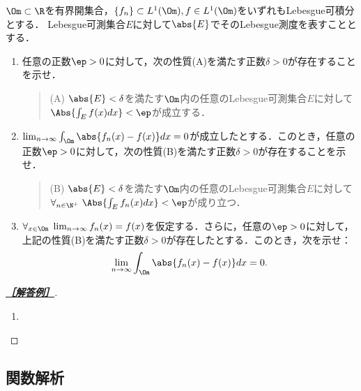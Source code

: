 \documentclass[uplatex,dvipdfmx]{jsarticle}
\begin{document}
\begin{tcolorbox}[colframe=ForestGreen, colback=ForestGreen!10!white,breakable,colbacktitle=ForestGreen!40!white,coltitle=black,fonttitle=\bfseries\sffamily,
    title=B 第9問（実解析）]
    $\Om\subset\R$を有界開集合，$\{f_n\}\subset L^1(\Om),f\in L^1(\Om)$をいずれもLebesgue可積分とする．
    Lebesgue可測集合$E$に対して$\abs{E}$でそのLebesgue測度を表すこととする．
    \begin{enumerate}
        \item 任意の正数$\ep>0$に対して，次の性質(A)を満たす正数$\delta>0$が存在することを示せ．
        \begin{quote}
            (A) $\abs{E}<\delta$を満たす$\Om$内の任意のLebesgue可測集合$E$に対して$\Abs{\int_Ef(x)dx}<\ep$が成立する．
        \end{quote}
        \item $\lim_{n\to\infty}\int_\Om\abs{f_n(x)-f(x)}dx=0$が成立したとする．このとき，任意の正数$\ep>0$に対して，次の性質(B)を満たす正数$\delta>0$が存在することを示せ．
        \begin{quote}
            (B) $\abs{E}<\delta$を満たす$\Om$内の任意のLebesgue可測集合$E$に対して$\forall_{n\in\N^+}\;\Abs{\int_Ef_n(x)dx}<\ep$が成り立つ．
        \end{quote}
        \item $\forall_{x\in\Om}\;\lim_{n\to\infty}f_n(x)=f(x)$を仮定する．さらに，任意の$\ep>0$に対して，上記の性質(B)を満たす正数$\delta>0$が存在したとする．このとき，次を示せ：
        \[\lim_{n\to\infty}\int_\Om\abs{f_n(x)-f(x)}dx=0.\]
    \end{enumerate}
\end{tcolorbox}
\begin{proof}[\textbf{\underline{［解答例］}}]\mbox{}
    \begin{enumerate}
        \item 
    \end{enumerate}
\end{proof}

\subsection{関数解析}
\end{document}
